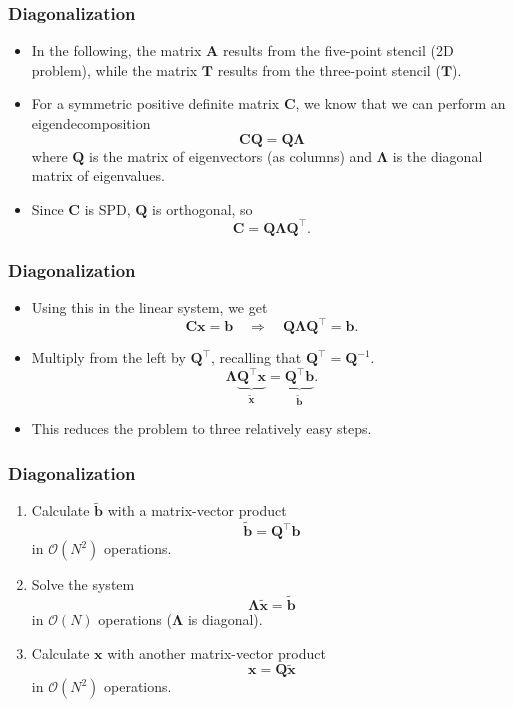 \begin{frame}
  \frametitle{Diagonalization}
  \begin{itemize}
  \item In the following, the matrix $\bm A$ results from the five-point
    stencil (2D problem), while the matrix $\bm T$ results from the three-point
    stencil ($\bm T$).
  \item For a symmetric positive definite matrix $\bm C$, we know that we can
    perform an eigendecomposition
    \[ \bm C \bm Q = \bm Q \bm \Lambda \]
    where $\bm Q$ is the matrix of eigenvectors (as columns) and $\bm \Lambda$
    is the diagonal matrix of eigenvalues.
  \item Since $\bm C$ is SPD, $\bm Q$ is orthogonal, so
    \[ \bm C = \bm Q \bm \Lambda \bm Q^\intercal. \]
  \end{itemize}
\end{frame}

\begin{frame}
  \frametitle{Diagonalization}
  \begin{itemize}
  \item Using this in the linear system, we get
    \[
      \bm C \bm x = \bm b \quad \Longrightarrow \quad
      \bm Q \bm \Lambda \bm Q^\intercal = \bm b.
    \]
  \item Multiply from the left by $\bm Q^\intercal$, recalling that
    $\bm Q^\intercal = \bm Q^{-1}$.
    \[
      \bm \Lambda \underbrace{\bm Q^\intercal \bm x}_{\tilde{\bm x}}
      = \underbrace{\bm Q^\intercal \bm b}_{\tilde{\bm b}}.
    \]
  \item This reduces the problem to three relatively easy steps.
  \end{itemize}
\end{frame}

\begin{frame}
  \frametitle{Diagonalization}
  \begin{enumerate}
  \item Calculate $\tilde{\bm b}$ with a matrix-vector product
    \[ \tilde{\bm b} = \bm Q^\intercal \bm b \]
    in $\mathcal{O}(N^2)$ operations.
  \item Solve the system
    \[ \bm \Lambda \tilde{\bm x} = \tilde{\bm b} \]
    in $\mathcal{O}(N)$ operations ($\bm \Lambda$ is diagonal).
  \item Calculate $\bm x$ with another matrix-vector product
    \[ \bm x = \bm Q \tilde{\bm x} \]
    in $\mathcal{O}(N^2)$ operations.
  \end{enumerate}
\end{frame}

